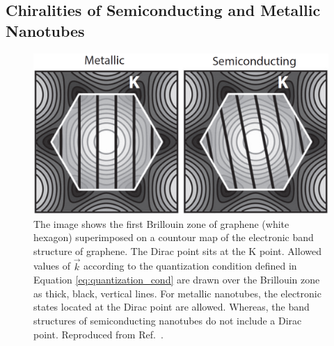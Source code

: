 \subsection{Chiralities of Semiconducting and Metallic Nanotubes}

\begin{figure}[ht]
	\centering
	\includegraphics[scale=0.35]{images/chapter_optical_props/metal_semi_amori}
	\caption{The image shows the first Brillouin zone of graphene (white hexagon) superimposed on a countour map of the electronic band structure of graphene. The Dirac point sits at the K point. Allowed values of $\vec{k}$ according to the quantization condition defined in Equation \eqref{eq:quantization_cond} are drawn over the Brillouin zone as thick, black, vertical lines. For metallic nanotubes, the electronic states located at the Dirac point are allowed. Whereas, the band structures of semiconducting nanotubes do not include a Dirac point. Reproduced from Ref.\ \cite{amori2018excitons}.}
	\label{fig:k_quant}
\end{figure}

